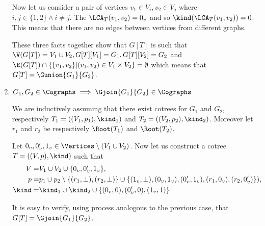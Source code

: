 \begin{enumerate}
          Now let us consider a pair of vertices $v_1 \in V_i, v_2 \in V_j$ where $i,j \in \{1,2\} \land i \neq j$. The $\LCA_T(v_1, v_2) = 0_v$ and so $\kind(\LCA_T(v_1, v_2)) = 0$. This means that there are no edges between vertices from different graphs.

          These three facts together show that $G[T]$ is such that $\V(G[T]) = V_1 \cup V_2, G[T][V_1] = G_1, G[T][V_2] = G_2$ and $\E(G[T]) \cap \{\{v_1, v_2\} | (v_1, v_2) \in V_1 \times V_2\} = \emptyset$ which means that $G[T] = \Gunion{G_1}{G_2}$.

    \item $G_1,G_2 \in \Cographs \implies \Gjoin{G_1}{G_2} \in \Cographs$

          We are inductively assuming that there exist cotrees for $G_1$ and $G_2$, respectively $T_1 = ((V_1, p_1), \kind_1)$ and $T_2 = ((V_2, p_2), \kind_2)$. Moreover let $r_1$ and $r_2$ be respectively $\Root(T_1)$ and $\Root(T_2)$.

          Let $0_v, 0_v', 1_v \in \Vertices \setminus (V_1 \cup V_2)$. Now let us construct a cotree $T = ((V, p), \kind)$ such that
          \[
              \begin{split}
                  V = & V_1\cup V_2 \cup \{0_v,0_v',1_v\}, \\
                  p = & p_1 \cup p_2 \setminus \{(r_1,\bot), (r_2, \bot)\} \cup \{(1_v, \bot), (0_v, 1_v), (0_v', 1_v), (r_1, 0_v), (r_2, 0_v')\}
                  ), \\
                  \kind = & \kind_1 \cup \kind_2 \cup \{(0_v,0), (0_v',0), (1_v,1)\} \\
              \end{split}
          \]

          It is easy to verify, using process analogous to the previous case, that $G[T] = \Gjoin{G_1}{G_2}$.





\end{enumerate}

